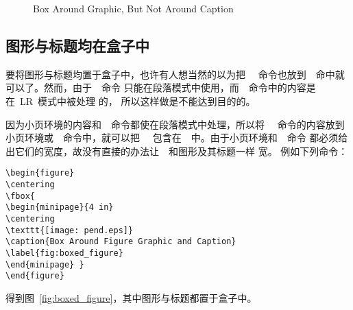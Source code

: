 \clearpage

\begin{figure} 
	\centering 
	\caption{Box Around Graphic, But Not Around Caption} 
	\label{fig:boxed_graphic}
\end{figure}

\subsection{图形与标题均在盒子中}

要将图形与标题均置于盒子中，也许有人想当然的以为把~~
命令也放到~~命中就可以了。然而，由于~~命令
只能在段落模式中使用，而~~命令中的内容是在~LR~模式中被处理
的，
所以这样做是不能达到目的的。

因为小页环境的内容和~~命令都使在段落模式中处理，所以将
~~命令的内容放到小页环境或~~命令中，就可以把
~~包含在~~中。由于小页环境和~~命令
都必须给出它们的宽度，故没有直接的办法让~~和图形及其标题一样
宽。 例如下列命令：
\begin{Verbatim}[xleftmargin=1cm]
\begin{figure} 
\centering 
\fbox{ 
\begin{minipage}{4 in} 
\centering 
\texttt{[image: pend.eps]} 
\caption{Box Around Figure Graphic and Caption} 
\label{fig:boxed_figure} 
\end{minipage} } 
\end{figure}
\end{Verbatim}
得到图~\ref{fig:boxed_figure}，其中图形与标题都置于盒子中。

\begin{figure} 
	\centering 
\end{figure}

